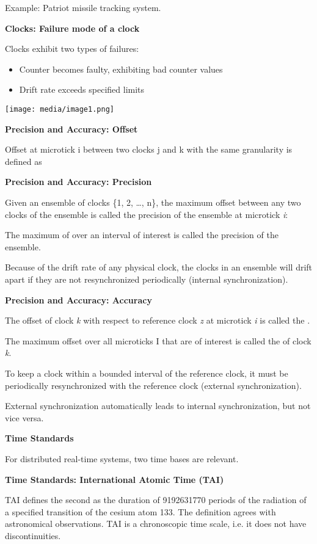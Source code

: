 Example: Patriot missile tracking system.

\textbf{Clocks: Failure mode of a clock}

Clocks exhibit two types of failures:

\begin{itemize}
\item
  Counter becomes faulty, exhibiting bad counter values
\item
  Drift rate exceeds specified limits
\end{itemize}

\texttt{[image: media/image1.png]}

\textbf{Precision and Accuracy: Offset}

Offset at microtick i between two clocks j and k with the same
granularity is defined as

\textbf{Precision and Accuracy: Precision}

Given an ensemble of clocks \{1, 2, \ldots{}, n\}, the maximum offset
between any two clocks of the ensemble is called the precision of the
ensemble at microtick \emph{i}:

The maximum of over an interval of interest is called the precision of
the ensemble.

Because of the drift rate of any physical clock, the clocks in an
ensemble will drift apart if they are not resynchronized periodically
(internal synchronization).

\textbf{Precision and Accuracy: Accuracy}

The offset of clock \emph{k} with respect to reference clock \emph{z} at
microtick \emph{i} is called the .

The maximum offset over all microticks I that are of interest is called
the of clock \emph{k}.

To keep a clock within a bounded interval of the reference clock, it
must be periodically resynchronized with the reference clock (external
synchronization).

External synchronization automatically leads to internal
synchronization, but not vice versa.

\textbf{Time Standards}

For distributed real-time systems, two time bases are relevant.

\textbf{Time Standards: International Atomic Time (TAI)}

TAI defines the second as the duration of 9192631770 periods of the
radiation of a specified transition of the cesium atom 133. The
definition agrees with astronomical observations. TAI is a chronoscopic
time scale, i.e. it does not have discontinuities.

